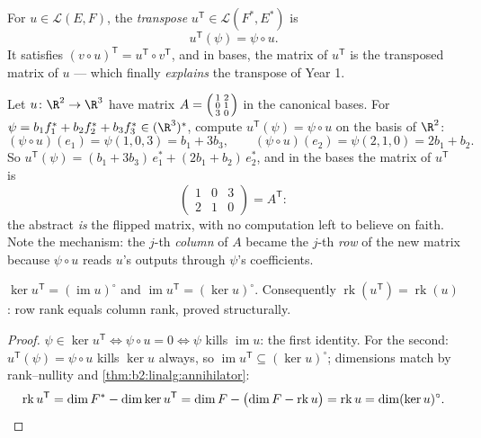 \begin{definition}\label{def:b2:linalg:transpose}
For $u \in \mathcal{L}(E, F)$, the \emph{transpose} $u^{\mathsf T} \in \mathcal{L}(F^*, E^*)$ is
\[
u^{\mathsf T}(\psi) = \psi \circ u .
\]
It satisfies $(v \circ u)^{\mathsf T} = u^{\mathsf T} \circ v^{\mathsf
T}$, and in  bases, the matrix of $u^{\mathsf T}$ is the
transposed matrix of $u$ --- which finally \emph{explains} the
transpose of Year 1.
\end{definition}

\begin{example}\label{ex:b2:linalg:transposework}
Let $u \colon \R^2 \to \R^3$ have matrix $A =
\begin{psmallmatrix} 1 & 2\\ 0 & 1\\ 3 & 0\end{psmallmatrix}$ in
the canonical bases. For $\psi = b_1f_1^* + b_2f_2^* + b_3f_3^*
\in (\R^3)^*$, compute $u^{\mathsf T}(\psi) = \psi \circ u$ on
the basis of $\R^2$:
\[
(\psi \circ u)(e_1) = \psi(1, 0, 3) = b_1 + 3b_3,
\qquad
(\psi \circ u)(e_2) = \psi(2, 1, 0) = 2b_1 + b_2 .
\]
So $u^{\mathsf T}(\psi) = (b_1 + 3b_3)\,e_1^* + (2b_1 +
b_2)\,e_2^*$, and in the  bases the matrix of $u^{\mathsf T}$
is
\[
\begin{pmatrix} 1 & 0 & 3\\ 2 & 1 & 0\end{pmatrix}
= A^{\mathsf T} :
\]
the abstract  \emph{is} the flipped matrix, with no
computation left to believe on faith. Note the mechanism: the
$j$-th \emph{column} of $A$ became the $j$-th \emph{row} of the
new matrix because $\psi \circ u$ reads $u$'s outputs through
$\psi$'s coefficients.
\end{example}

\begin{proposition}\label{prop:b2:linalg:transposerank}
$\ker u^{\mathsf T} = (\operatorname{im} u)^{\circ}$ and
$\operatorname{im} u^{\mathsf T} = (\ker u)^{\circ}$. Consequently
$\operatorname{rk}(u^{\mathsf T}) = \operatorname{rk}(u)$: row rank
equals column rank, proved structurally.
\end{proposition}

\begin{proof}
$\psi \in \ker u^{\mathsf T} \iff \psi \circ u = 0 \iff \psi$ kills
$\operatorname{im} u$: the first identity. For the second: $u^{\mathsf
T}(\psi) = \psi \circ u$ kills $\ker u$ always, so
$\operatorname{im} u^{\mathsf T} \subseteq (\ker u)^\circ$;
dimensions match by rank--nullity and
\cref{thm:b2:linalg:annihilator}:
\[
\operatorname{rk} u^{\mathsf T} = \dim F^* - \dim\ker u^{\mathsf T}
= \dim F - \bigl(\dim F - \operatorname{rk} u\bigr)
= \operatorname{rk} u
= \dim (\ker u)^{\circ} . \qedhere
\]
\end{proof}

